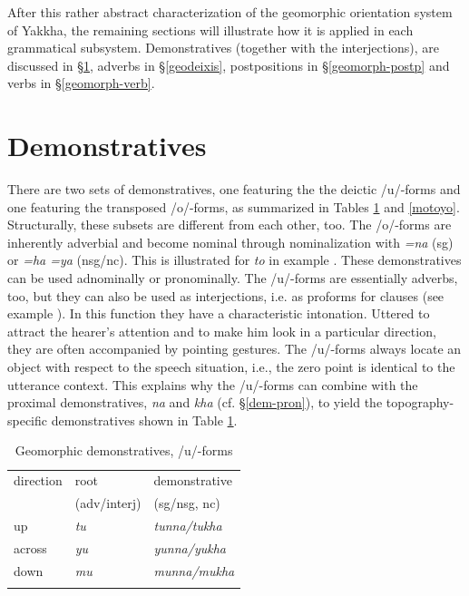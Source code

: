 After this rather abstract characterization of the geomorphic orientation system of Yakkha, the remaining sections will illustrate how it is applied in each grammatical subsystem. Demonstratives (together with the interjections), are discussed in §\ref{dem-pron-2}, adverbs in  §\ref{geodeixis}, postpositions  in §\ref{geomorph-postp} and verbs in §\ref{geomorph-verb}.



\section{Demonstratives}\label{dem-pron-2}	

There are two sets of demonstratives, one featuring the the deictic /u/-forms and one featuring the transposed /o/-forms, as summarized in Tables \ref{mutuyu} and \ref{motoyo}. Structurally, these subsets are different from each other, too.  The /o/-forms are inherently adverbial and become nominal through nominalization with \emph{=na} ({\sc sg}) or \emph{=ha \ti =ya} ({\sc nsg/nc}). This is illustrated for \emph{to} in example \Next. These demonstratives can be used adnominally or pronominally. 
The /u/-forms are  essentially adverbs, too, but they can also be used as interjections, i.e. as proforms for clauses (see example \NNext). In this function they have a characteristic intonation. Uttered to attract the hearer's attention and to make him look in a particular direction, they are often accompanied by pointing gestures. The /u/-forms always locate an object with respect to the speech situation, i.e., the zero point is identical to the utterance context. This explains why the /u/-forms can combine with the proximal demonstratives, \emph{na} and \emph{kha} (cf. §\ref{dem-pron}),  to yield the topography-specific demonstratives shown in Table \ref{mutuyu}. 

\begin{table}[htp]
\begin{centering}
\begin{tabular}{lll}
\lsptoprule
 {\sc direction} & {\sc root} & {\sc demonstrative}  \\
  & {\sc   ({\sc adv/interj})} & ({\sc sg/nsg, nc})\\
\midrule
{\sc up}&\emph{tu} &\emph{tunna/tukha}\\
{\sc across } &\emph{yu} &\emph{yunna/yukha}\\
{\sc down}&\emph{mu} &\emph{munna/mukha}\\
\lspbottomrule
\end{tabular}\\
\caption{Geomorphic demonstratives,  /u/-forms} \label{mutuyu}
\end{centering}
\end{table}


